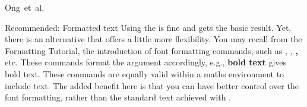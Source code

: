 
\newcommand{\todo}[1]{\emph{\textcolor{red}{#1}}}
\newcommand{\comment}[1]{\emph{\textcolor{blue}{#1}}}


%






Ong~et~al.~\cite{ong2005}






Recommended: 
Formatted text
Using the \mbox is fine and gets the basic result. Yet, there is an alternative that offers a little more flexibility. You may recall from the Formatting Tutorial, the introduction of font formatting commands, such as \textrm, \textit, \textbf, etc. These commands format the argument accordingly, e.g., \textbf{bold text} gives bold text. These commands are equally valid within a maths environment to include text. The added benefit here is that you can have better control over the font formatting, rather than the standard text achieved with \mbox.

